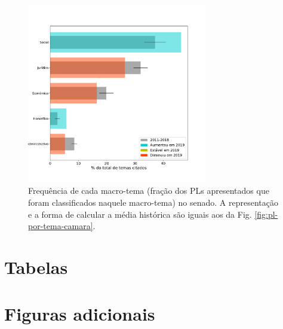 \documentclass[12pt,a4paper]{article}
\newcommand{\HX}[1]{{\centering\color{red}\large<#1>}}
\begin{document}
\begin{figure}[H]
\centering
\includegraphics[width=0.7\textwidth]{graficos/senado/pls-macro-temas-senado-r-completo.pdf}
\caption{Frequência de cada macro-tema (fração dos PLs apresentados que foram classificados
  naquele macro-tema) no senado. A representação e a forma de calcular a média histórica são iguais
  aos da Fig. \ref{fig:pl-por-tema-camara}.}
\label{fig:pl-por-macrotema-senado}
\end{figure}

\HX{Incluir tabela com dados sobre temas}

\section{Tabelas}
{\footnotesize

}

{\footnotesize

}


\section{Figuras adicionais}
\end{document}
